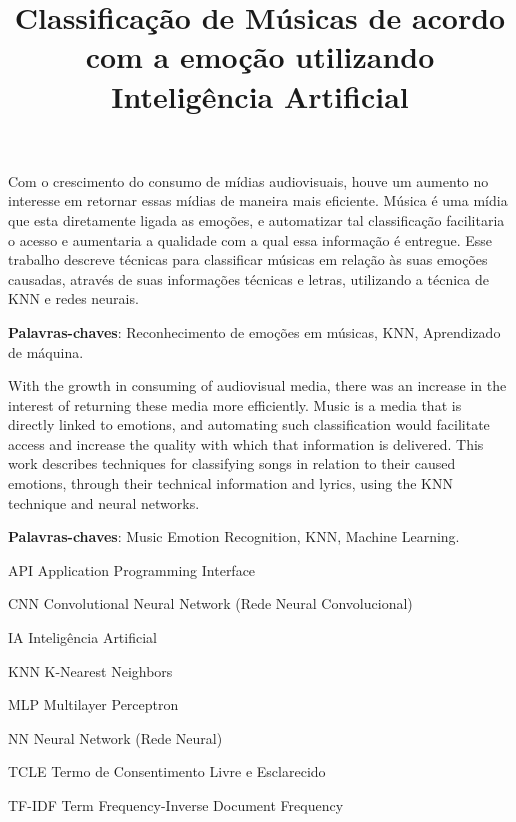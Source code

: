 \documentclass[
	12pt,				%
	openright,			%
	oneside,
	a4paper,			%
	english,			%
	french,				%
	spanish,			%
	brazil				%
	]{abntex2}
\title{Classificação de Músicas de acordo com a emoção utilizando Inteligência Artificial}
\begin{document}
\frenchspacing 


\imprimircapa
\imprimirfolhaderosto


\setlength{\absparsep}{18pt}
\begin{resumo}
  
\noindent 
Com o crescimento do consumo de mídias audiovisuais, houve um aumento no interesse em retornar essas mídias de maneira mais eficiente. Música é uma mídia que esta diretamente ligada as emoções, e automatizar tal classificação facilitaria o acesso e aumentaria a qualidade com a qual essa informação é entregue. Esse trabalho descreve técnicas para classificar músicas em relação às suas emoções causadas, através de suas informações técnicas e letras, utilizando a técnica de KNN e redes neurais. 

\noindent \textbf{Palavras-chaves}: Reconhecimento de emoções em músicas, KNN, Aprendizado de máquina.

\end{resumo}
{
\setlength{\absparsep}{18pt}
\begin{resumo}

With the growth in consuming of audiovisual media, there was an increase in the interest of returning these media more efficiently. Music is a media that is directly linked to emotions, and automating such classification would facilitate access and increase the quality with which that information is delivered. This work describes techniques for classifying songs in relation to their caused emotions, through their technical information and lyrics, using the KNN technique and neural networks.

\noindent \textbf{Palavras-chaves}: Music Emotion Recognition, KNN, Machine Learning.
\end{resumo}
}

\cleardoublepage

\begin{siglas}
  \item[API] Application Programming Interface
  \item[CNN] Convolutional Neural Network (Rede Neural Convolucional)
  \item[IA] Inteligência Artificial
  \item[KNN] K-Nearest Neighbors
  \item[MLP] Multilayer Perceptron
  \item[NN] Neural Network (Rede Neural)
  \item[TCLE] Termo de Consentimento Livre e Esclarecido
  \item[TF-IDF] Term Frequency-Inverse Document Frequency
\end{siglas}
\end{document}
